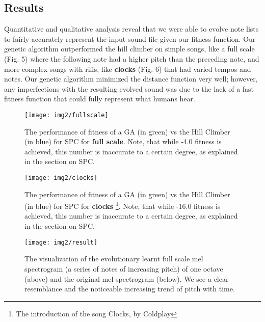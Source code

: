 \documentclass{pnastwo}
\begin{document}
\begin{article}
\subsection{Results}
Quantitative and qualitative analysis reveal that we were able to evolve note lists to fairly accurately represent the input sound file given our fitness function. Our genetic algorithm outperformed the hill climber on simple songs, like a full scale (Fig. 5) where the following note had a higher pitch than the preceding note, and more complex songs with riffs, like \textbf{clocks} (Fig. 6) that had varied tempos and notes. Our genetic algorithm minimized the distance function very well; however, any imperfections with the resulting evolved sound was due to the lack of a fast fitness function that could fully represent what humans hear.
\begin{figure}
\centerline{\texttt{[image: img2/fullscale]}}
\caption{The performance of fitness of a GA (in green) vs the Hill Climber (in blue) for SPC for \textbf{full scale}. Note, that while -4.0 fitness is achieved, this number is inaccurate to a certain degree, as explained in the section on SPC.}\label{fig7}
\end{figure}

\begin{figure}
\centerline{\texttt{[image: img2/clocks]}}
\caption{The performance of fitness of a GA (in green) vs the Hill Climber (in blue) for SPC for \textbf{clocks} \footnote{The introduction of the song Clocks, by Coldplay}. Note, that while -16.0 fitness is achieved, this number is inaccurate to a certain degree, as explained in the section on SPC.}\label{fig8}
\end{figure}

\begin{figure}
\centerline{\texttt{[image: img2/result]}}
\caption{The visualization of the evolutionary learnt full scale mel spectrogram (a series of notes of increasing pitch) of one octave (above) and the original mel spectrogram (below). We see a clear resemblance and the noticeable increasing trend of pitch with time.}\label{fig4}
\end{figure}



\end{article}
\end{document}
